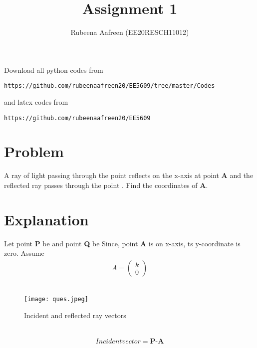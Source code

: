\documentclass[journal,12pt,twocolumn]{IEEEtran}
\begin{document}
     \def\rightbox#1{\makebox[0in][r]{#1}}
     \def\centbox#1{\makebox[0in]{#1}}
     \def\topbox#1{\raisebox{-\baselineskip}[0in][0in]{#1}}
     \def\midbox#1{\raisebox{-0.5\baselineskip}[0in][0in]{#1}}
\vspace{3cm}
\title{Assignment 1}
\author{Rubeena Aafreen (EE20RESCH11012)}
\maketitle
\newpage
\bigskip
\renewcommand{\thefigure}{\theenumi}
\renewcommand{\thetable}{\theenumi}
Download all python codes from 
\begin{lstlisting}
https://github.com/rubeenaafreen20/EE5609/tree/master/Codes
\end{lstlisting}
%
and latex codes from 
%
\begin{lstlisting}
https://github.com/rubeenaafreen20/EE5609
\end{lstlisting}
%
\section{Problem}
A ray of light passing through the point 
reflects on the x-axis at point \textbf{A} and the reflected ray passes through the point . Find
the coordinates of \textbf{A}.
\section{Explanation}
Let point \textbf{P} be  and point \textbf{Q} be 
Since, point \textbf{A} is on x-axis, ts y-coordinate is zero.
Assume \begin{align}
    A=\begin{pmatrix} k \\ 0 \end{pmatrix}
\end{align} \\
\begin{figure}[h]
\centering
\texttt{[image: ques.jpeg]}
\caption{Incident and reflected ray vectors}
\label{fig:}
\end{figure}
\\

     \begin{align}
     Incident vector = \textbf{P-A}
      \end{align}
      
\end{document}
